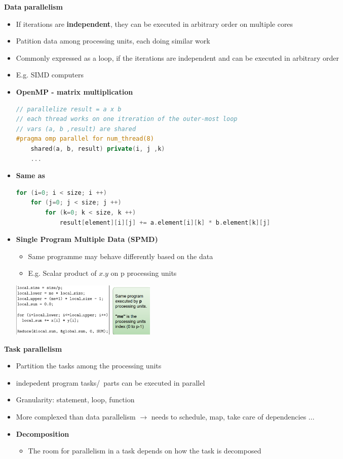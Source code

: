 \documentclass[10pt, landscape]{article}
\begin{document}
\begin{multicols}{4}
\textbf{Data parallelism}
\begin{itemize}
    \item If iterations are \textbf{independent}, they can be executed in arbitrary order on multiple cores
    \item Patition data among processing units, each doing similar work 
    \item Commonly expressed as a loop, if the iterations are independent and can be executed in arbitrary order
    \item E.g. SIMD computers
    \item \textbf{OpenMP - matrix multiplication} 
    \begin{lstlisting}[language=C++, breaklines=true, breakatwhitespace=true]
// parallelize result = a x b
// each thread works on one itreration of the outer-most loop 
// vars (a, b ,result) are shared
#pragma omp parallel for num_thread(8)
    shared(a, b, result) private(i, j ,k)
    ...
        \end{lstlisting}
    \item \textbf{Same as}
    \begin{lstlisting}[language=C++, breaklines=true, breakatwhitespace=true]
for (i=0; i < size; i ++) 
    for (j=0; j < size; j ++) 
        for (k=0; k < size, k ++) 
            result[element][i][j] += a.element[i][k] * b.element[k][j]
    \end{lstlisting}
    \item \textbf{Single Program Multiple Data (SPMD)}
    \begin{itemize}
        \item Same programme may behave differently based on the data
        \item E.g. Scalar product of $x.y$ on p processing units 
    \end{itemize}
\includegraphics*[width=7cm]{spmd}
\end{itemize}


\textbf{Task parallelism}
\begin{itemize}
    \item Partition the tasks among the processing units
    \item indepedent program tasks/\ parts can be executed in parallel
    \item Granularity: statement, loop, function 
    \item More complexed than data parallelism $\rightarrow$ needs to schedule, map, take care of dependencies ...
    \item \textbf{Decomposition}
    \begin{itemize}
        \item The room for parallelism in a task depends on how the task is decomposed
    \end{itemize}
\end{itemize}


\end{multicols}
\end{document}
